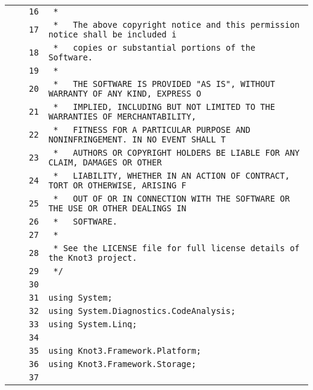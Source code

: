 \documentclass[a4paper,10pt]{article}
\begin{document}
\begin{longtable}[l]{lrrl}
\cellcolor{gray} &  & \verb~16~ & \verb~ *~\\
\cellcolor{gray} &  & \verb~17~ & \verb~ *   The above copyright notice and this permission notice shall be included i~\\
\cellcolor{gray} &  & \verb~18~ & \verb~ *   copies or substantial portions of the Software.~\\
\cellcolor{gray} &  & \verb~19~ & \verb~ *~\\
\cellcolor{gray} &  & \verb~20~ & \verb~ *   THE SOFTWARE IS PROVIDED "AS IS", WITHOUT WARRANTY OF ANY KIND, EXPRESS O~\\
\cellcolor{gray} &  & \verb~21~ & \verb~ *   IMPLIED, INCLUDING BUT NOT LIMITED TO THE WARRANTIES OF MERCHANTABILITY,~\\
\cellcolor{gray} &  & \verb~22~ & \verb~ *   FITNESS FOR A PARTICULAR PURPOSE AND NONINFRINGEMENT. IN NO EVENT SHALL T~\\
\cellcolor{gray} &  & \verb~23~ & \verb~ *   AUTHORS OR COPYRIGHT HOLDERS BE LIABLE FOR ANY CLAIM, DAMAGES OR OTHER~\\
\cellcolor{gray} &  & \verb~24~ & \verb~ *   LIABILITY, WHETHER IN AN ACTION OF CONTRACT, TORT OR OTHERWISE, ARISING F~\\
\cellcolor{gray} &  & \verb~25~ & \verb~ *   OUT OF OR IN CONNECTION WITH THE SOFTWARE OR THE USE OR OTHER DEALINGS IN~\\
\cellcolor{gray} &  & \verb~26~ & \verb~ *   SOFTWARE.~\\
\cellcolor{gray} &  & \verb~27~ & \verb~ *~\\
\cellcolor{gray} &  & \verb~28~ & \verb~ * See the LICENSE file for full license details of the Knot3 project.~\\
\cellcolor{gray} &  & \verb~29~ & \verb~ */~\\
\cellcolor{gray} &  & \verb~30~ & \verb~~\\
\cellcolor{gray} &  & \verb~31~ & \verb~using System;~\\
\cellcolor{gray} &  & \verb~32~ & \verb~using System.Diagnostics.CodeAnalysis;~\\
\cellcolor{gray} &  & \verb~33~ & \verb~using System.Linq;~\\
\cellcolor{gray} &  & \verb~34~ & \verb~~\\
\cellcolor{gray} &  & \verb~35~ & \verb~using Knot3.Framework.Platform;~\\
\cellcolor{gray} &  & \verb~36~ & \verb~using Knot3.Framework.Storage;~\\
\cellcolor{gray} &  & \verb~37~ & \verb~~\\

\end{longtable}
\end{document}
